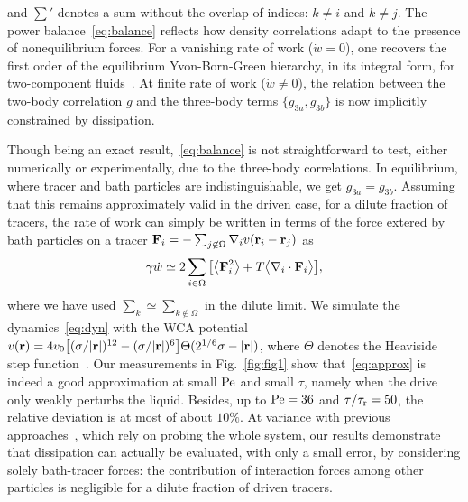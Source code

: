 \documentclass[pre, superscriptaddress, twocolumn,pre]{revtex4-1}
\begin{document}
and $\sum'$ denotes a sum without the overlap of indices: $k\neq i$ and $k\neq j$. The power balance~\eqref{eq:balance} reflects how density correlations adapt to the presence of nonequilibrium forces. For a vanishing rate of work ($\dot w = 0$), one recovers the first order of the equilibrium Yvon-Born-Green hierarchy, in its integral form, for two-component fluids~\cite{Hansen2013}. At finite rate of work ($\dot w\neq0$), the relation between the two-body correlation $g$ and the three-body terms $\{g_{3a},g_{3b}\}$ is now implicitly constrained by dissipation.


Though being an exact result,~\eqref{eq:balance} is not straightforward to test, either numerically or experimentally, due to the three-body correlations. In equilibrium, where tracer and bath particles are indistinguishable, we get $g_{3a}=g_{3b}$. Assuming that this remains approximately valid in the driven case, for a dilute fraction of tracers, the rate of work can simply be written in terms of the force extered by bath particles on a tracer ${\bf F}_i =- \sum_{j\not\in\Omega}\nabla_iv({\bf r}_i-{\bf r}_j)$ as
\begin{equation}\label{eq:approx}
	\gamma\dot w \simeq 2\sum_{i\in\Omega} \big[ \big\langle{\bf F}_i^2\big\rangle + T \big\langle\nabla_i\cdot{\bf F}_i\big\rangle \big] ,
\end{equation}
where we have used $\sum_k\simeq\sum_{k\not\in\Omega}$ in the dilute limit. We simulate the dynamics~\eqref{eq:dyn} with the WCA potential $v({\bf r})=4v_0\big[(\sigma/|{\bf r}|)^{12}-(\sigma/|{\bf r}|)^6\big]\Theta(2^{1/6}\sigma-|{\bf r}|)$, where $\Theta$ denotes the Heaviside step function~\cite{WCA1971}. Our measurements in Fig.~\ref{fig:fig1} show that~\eqref{eq:approx} is indeed a good approximation at small $\rm Pe$ and small $\tau$, namely when the drive only weakly perturbs the liquid. Besides, up to ${\rm Pe}=36$ and $\tau/\tau_{\rm r}=50$, the relative deviation is at most of about $10\%$. At variance with previous approaches~\cite{Harada2005, Lander2012, Battle604}, which rely on probing the whole system, our results demonstrate that dissipation can actually be evaluated, with only a small error, by considering solely bath-tracer forces: the contribution of interaction forces among other particles is negligible for a dilute fraction of driven tracers.
\end{document}
